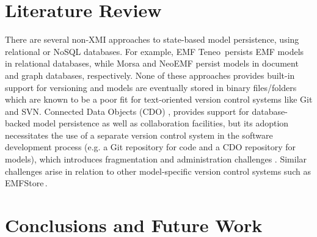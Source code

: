 \documentclass[10pt,conference]{IEEEtran}
\begin{document}
\section{Literature Review}
\label{sec:literature_review}
 There are several non-XMI approaches to state-based model persistence, using relational or NoSQL databases. For example, EMF Teneo\,\cite{eclipse2017teneo} persists EMF models in relational databases, while Morsa \cite{DBLP:conf/models/Espinazo-PaganCM11} and NeoEMF \cite{daniel2016neoemf} persist models in document and graph databases, respectively.  None of these approaches provides built-in support for versioning and models are eventually stored in binary files/folders which are known to be a poor fit for text-oriented version control systems like Git and SVN. Connected Data Objects (CDO) \cite{eclipse2017cdo}, provides support for database-backed model persistence as well as collaboration facilities, but its adoption necessitates the use of a separate version control system in the software development process (e.g. a Git repository for code and a CDO repository for models), which introduces fragmentation and administration challenges \cite{barmpis2014evaluation}. Similar challenges arise in relation to other model-specific version control systems such as EMFStore\,\cite{koegel2010emfstore}.

\section{Conclusions and Future Work}
\label{sec:conlcusions_and_future_work}


%
%
\end{document}
